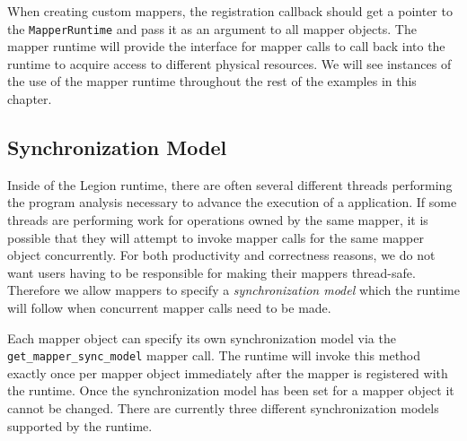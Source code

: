 When creating custom mappers, the registration callback should get a pointer
to the {\tt MapperRuntime} and pass it as an argument to all mapper objects.
The mapper runtime will provide the interface for mapper calls to call back
into the runtime to acquire access to different physical resources. We 
will see instances of the use of the mapper runtime throughout the rest of
the examples in this chapter.

\subsection{Synchronization Model}
\label{subsec:mapping:sync}

Inside of the Legion runtime, there are often several different threads
performing the program analysis necessary to advance the execution of a
application. If some threads are performing work for operations 
owned by the same mapper, it is possible that they will attempt to 
invoke mapper calls for the same mapper object concurrently. For both 
productivity and correctness reasons, we do not want users having to be
responsible for making their mappers thread-safe. Therefore we allow
mappers to specify a {\em synchronization model} which the runtime will
follow when concurrent mapper calls need to be made.

Each mapper object can specify its own synchronization model via the
{\tt get\_mapper\_sync\_model} mapper call. The runtime will invoke this
method exactly once per mapper object immediately after the mapper is
registered with the runtime. Once the synchronization model has been set
for a mapper object it cannot be changed. There are currently three
different synchronization models supported by the runtime.

